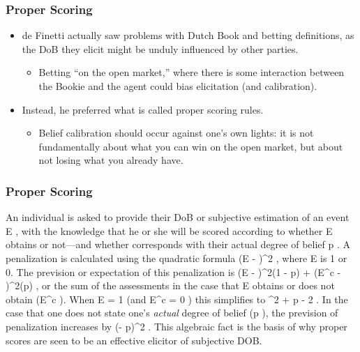 \documentclass{beamer}
\begin{document}

\frame
{
\frametitle{Proper Scoring}

\begin{itemize}
    \item<1-> de Finetti actually saw problems with Dutch Book and betting definitions, as the DoB they elicit might be unduly influenced by other parties.
    \begin{itemize}
        \item<2-> Betting ``on the open market,'' where there is some interaction between the Bookie and the agent could bias elicitation (and calibration).
    \end{itemize}
    \item<3-> Instead, he preferred what is called proper scoring rules.
    \begin{itemize}
        \item<4->  Belief calibration should occur against one's own lights: it is not fundamentally about what you can win on the open market, but about not losing what you already have.
    \end{itemize}
    
\end{itemize}

}


\frame
{
\frametitle{Proper Scoring}

An individual is asked to provide their DoB or subjective estimation \math \pi \endmath\space of an event \math E \endmath, with the knowledge that he or she will be scored according to whether \math E \endmath\space obtains or not---and whether \math \pi \endmath\space corresponds with their actual degree of belief \math p \endmath.  A penalization is calculated using the quadratic formula \math (E - \pi)^2 \endmath, where \math E \endmath\space is 1 or 0.  The prevision or expectation of this penalization is \math (E - \pi)^2(1 - p) + (E^c - \pi)^2(p) \endmath, or the sum of the assessments in the case that \math E \endmath\space obtains or does not obtain (\math E^c \endmath).  When \math E = 1 \endmath\space (and \math E^c = 0 \endmath) this simplifies to \math \pi^2 + p - 2 \endmath.    In the case that one does not state one's \textit{actual} degree of belief (\math \pi \neq p \endmath), the prevision of penalization increases by \math (\pi - p)^2 \endmath.    This algebraic fact is the basis of why proper scores are seen to be an effective elicitor of subjective DOB.

}
\end{document}
